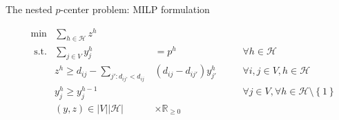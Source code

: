 \documentclass[utf8,aspectratio=169,ngerman,english]{beamer}
\newcommand{\inH}{h \in \mathcal H}
\begin{document}
\begin{frame}{The nested $p$-center problem: MILP formulation}
\begin{minipage}[t]{0.59\linewidth}
\begin{block}
\begin{subequations}
                \begin{alignat}{4}
                     & \min         & \sum_{\inH}z^{h}                                                                          &                               &  &  &                                                             \\
                     & \text{ s.t.} & \sum_{j \in V}y_{j}^h                                                                     & =     p^{h}                   &  &  & \forall \inH                                                \\
                     &              & z^{h} \geq d_{ij} - \sum_{j':d_{ij'} < d_{ij}}                                            & (d_{ij} - d_{ij'})y_{j'}^h \; &  &  & \forall i,j \in V, h \in \mathcal H                         \\
                     &              & y_{j}^h \geq  y_j^{h-1}                                                                   &                               &  &  & \forall j \in V, \forall \inH \setminus \left \{1 \right \} \\
                     &              & (y,z)                                           \in \left|V\right|\left|\mathcal H\right| & \times \mathbb{R}_{\geq 0}    &  &  &
                \end{alignat}
            \end{subequations}
        \end{block}
    \end{minipage}
\end{frame}
\end{document}
